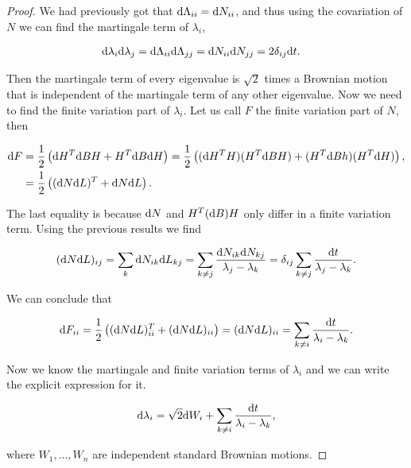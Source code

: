 \begin{proof}
    We had previously got that $\mathrm d \Lambda_{ii} = \mathrm d N_{ii}$, and thus using the covariation of $N$ we can find the martingale term of $\lambda_{i}$,

    \begin{align*}
        \mathrm d \lambda_i\mathrm d \lambda_j &= \mathrm d \Lambda_{ii} \mathrm d\Lambda_{jj} = \mathrm d N_{ii}\mathrm d N_{jj} = 2\delta_{ij}\mathrm d t.
    \end{align*}

    Then the martingale term of every eigenvalue is $\sqrt2$ times a Brownian motion that is independent of the martingale term of any other eigenvalue. Now we need to find the finite variation part of $\lambda_i$. Let us call $F$ the finite variation part of $N$, then

    \begin{align*}
        \mathrm d F &= \frac12\left( \mathrm d H^T \mathrm d B H + H^T \mathrm d B \mathrm d H \right) = \frac12\left( (\mathrm d H^T H)(H^T\mathrm d B H) + (H^T \mathrm d B h)(H^T \mathrm d H) \right),\\ 
        &= \frac12\left( (\mathrm d N \mathrm d L)^T + \mathrm d N \mathrm d L  \right).
    \end{align*}

    The last equality is because $\mathrm d N$ and $H^T (\mathrm d B) H$ only differ in a finite variation term. Using the previous results we find

    \begin{equation*}
        (\mathrm d N \mathrm d L)_{ij} = \sum_{k} \mathrm d N_{ik}\mathrm d L_{kj} = \sum_{k\neq j} \frac{\mathrm d N_{ik}\mathrm d N_{kj}}{\lambda_j - \lambda_k} = \delta_{ij} \sum_{k\neq j} \frac{\mathrm d t}{\lambda_j - \lambda_k}.
    \end{equation*}

    We can conclude that

    \begin{equation*}
        \mathrm d F_{ii} = \frac12\left( (\mathrm d N \mathrm d L)_{ii}^T + (\mathrm d N \mathrm d L)_{ii}  \right) = (\mathrm d N \mathrm d L)_{ii} = \sum_{k\neq i} \frac{\mathrm d t}{\lambda_i - \lambda_k}.
    \end{equation*}

    Now we know the martingale and finite variation terms of $\lambda_i$ and we can write the explicit expression for it.

    \begin{equation*}
        \mathrm d \lambda_i = \sqrt2\mathrm d W_i + \sum_{k\neq i} \frac{\mathrm d t }{\lambda_i - \lambda_k},
    \end{equation*}

    \noindent where $W_1, \dots, W_n$ are independent standard Brownian motions.
\end{proof}







